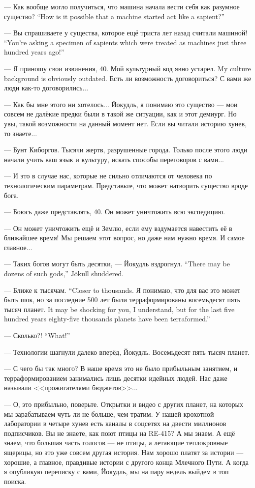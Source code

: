{--- Как вообще могло получиться, что машина начала вести себя как разумное существо?}
{``How is it possible that a machine started act like a sapient?''}

{--- Вы спрашиваете у существа, которое ещё триста лет назад считали машиной!}
{``You're asking a specimen of sapients which were treated as machines just three hundred years ago!''}

--- Я приношу свои извинения, 40.
{Мой культурный код явно устарел.}
{My culture background is obviously outdated.}
Есть ли возможность договориться?
С вами же люди как-то договорились...

--- Как бы мне этого ни хотелось...
Йокудль, я понимаю это существо --- мои совсем не далёкие предки были в такой же ситуации, как и этот демиург.
Но увы, такой возможности на данный момент нет.
Если вы читали историю хунев, то знаете...

--- Бунт Киборгов.
Тысячи жертв, разрушенные города.
Только после этого люди начали учить ваш язык и культуру, искать способы переговоров с вами...

--- И это в случае нас, которые не сильно отличаются от человека по технологическим параметрам.
Представьте, что может натворить существо вроде бога.

--- Боюсь даже представлять, 40.
Он может уничтожить всю экспедицию.

--- Он может уничтожить ещё и Землю, если ему вздумается навестить её в ближайшее время!
Мы решаем этот вопрос, но даже нам нужно время.
И самое главное...

{--- Таких богов могут быть десятки, --- Йокудль вздрогнул.}
{``There may be dozens of such gods,'' Jökull shuddered.}

{--- Ближе к тысячам.}
{``Closer to thousands.}
{Я понимаю, что для вас это может быть шок, но за последние 500 лет были терраформированы восемьдесят пять тысяч планет.}
{It may be shocking for you, I understand, but for the last five hundred years eighty-five thousands planets have been terraformed.''}

{--- Сколько?!}
{``What!''}

--- Технологии шагнули далеко вперёд, Йокудль.
Восемьдесят пять тысяч планет.

--- С чего бы так много?
В наше время это не было прибыльным занятием, и терраформированием занимались лишь десятки идейных людей.
Нас даже называли <<прожигателями бюджетов>>...

--- О, это прибыльно, поверьте.
Открытки и видео с других планет, на которых мы зарабатываем чуть ли не больше, чем тратим.
У нашей крохотной лаборатории в четыре хунев есть каналы в соцсетях на двести миллионов подписчиков.
Вы не знаете, как поют птицы на RE-415?
А мы знаем.
А ещё знаем, что большая часть голосов --- не птицы, а летающие теплокровные ящерицы, но это уже совсем другая история.
Нам хорошо платят за истории --- хорошие, а главное, правдивые истории с другого конца Млечного Пути.
А когда я опубликую переписку с вами, Йокудль, мы на пару недель выйдем в топ поиска.

